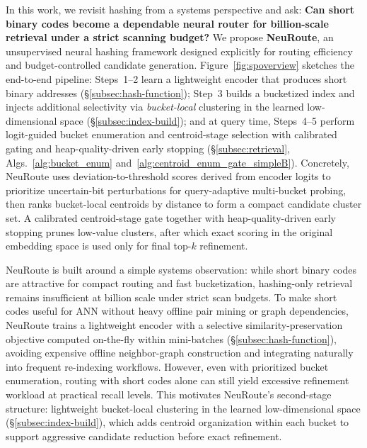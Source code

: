 \documentclass[sigconf, nonacm]{acmart}
\begin{document}
In this work, we revisit hashing from a systems perspective and ask:
\textbf{Can short binary codes become a dependable neural router for billion-scale retrieval under a strict scanning budget?}
We propose \textbf{NeuRoute}, an unsupervised neural hashing framework designed explicitly for routing efficiency and budget-controlled candidate generation.
Figure~\ref{fig:spoverview} sketches the end-to-end pipeline: Steps~1--2 learn a lightweight encoder that produces short binary addresses (\S\ref{subsec:hash-function}); Step~3 builds a bucketized index and injects additional selectivity via \emph{bucket-local} clustering in the learned low-dimensional space (\S\ref{subsec:index-build}); and at query time, Steps~4--5 perform logit-guided bucket enumeration and centroid-stage selection with calibrated gating and heap-quality-driven early stopping (\S\ref{subsec:retrieval}, Algs.~\ref{alg:bucket_enum} and~\ref{alg:centroid_enum_gate_simpleB}).
Concretely, NeuRoute uses deviation-to-threshold scores derived from encoder logits to prioritize uncertain-bit perturbations for query-adaptive multi-bucket probing, then ranks bucket-local centroids by distance to form a compact candidate cluster set.
A calibrated centroid-stage gate together with heap-quality-driven early stopping prunes low-value clusters, after which exact scoring in the original embedding space is used only for final top-$k$ refinement.

NeuRoute is built around a simple systems observation: while short binary codes are attractive for compact routing and fast bucketization, hashing-only retrieval remains insufficient at billion scale under strict scan budgets.
To make short codes useful for ANN without heavy offline pair mining or graph dependencies, NeuRoute trains a lightweight encoder with a selective similarity-preservation objective computed on-the-fly within mini-batches (\S\ref{subsec:hash-function}), avoiding expensive offline neighbor-graph construction and integrating naturally into frequent re-indexing workflows.
However, even with prioritized bucket enumeration, routing with short codes alone can still yield excessive refinement workload at practical recall levels.
This motivates NeuRoute's second-stage structure: lightweight bucket-local clustering in the learned low-dimensional space (\S\ref{subsec:index-build}), which adds centroid organization within each bucket to support aggressive candidate reduction before exact refinement.
\end{document}
